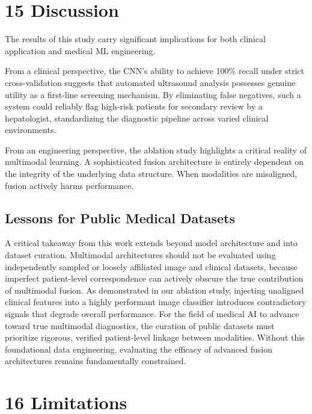 \section{15 Discussion}\label{discussion}

The results of this study carry significant implications for both
clinical application and medical ML engineering.

From a clinical perspective, the CNN's ability to achieve 100\% recall
under strict cross-validation suggests that automated ultrasound
analysis possesses genuine utility as a first-line screening mechanism.
By eliminating false negatives, such a system could reliably flag
high-risk patients for secondary review by a hepatologist, standardizing
the diagnostic pipeline across varied clinical environments.

From an engineering perspective, the ablation study highlights a
critical reality of multimodal learning. A sophisticated fusion
architecture is entirely dependent on the integrity of the underlying
data structure. When modalities are misaligned, fusion actively harms
performance.

\subsection{Lessons for Public Medical
Datasets}\label{lessons-for-public-medical-datasets}

A critical takeaway from this work extends beyond model architecture and
into dataset curation. Multimodal architectures should not be evaluated
using independently sampled or loosely affiliated image and clinical
datasets, because imperfect patient-level correspondence can actively
obscure the true contribution of multimodal fusion. As demonstrated in
our ablation study, injecting unaligned clinical features into a highly
performant image classifier introduces contradictory signals that
degrade overall performance. For the field of medical AI to advance
toward true multimodal diagnostics, the curation of public datasets must
prioritize rigorous, verified patient-level linkage between modalities.
Without this foundational data engineering, evaluating the efficacy of
advanced fusion architectures remains fundamentally constrained.

\section{16 Limitations}\label{limitations}

